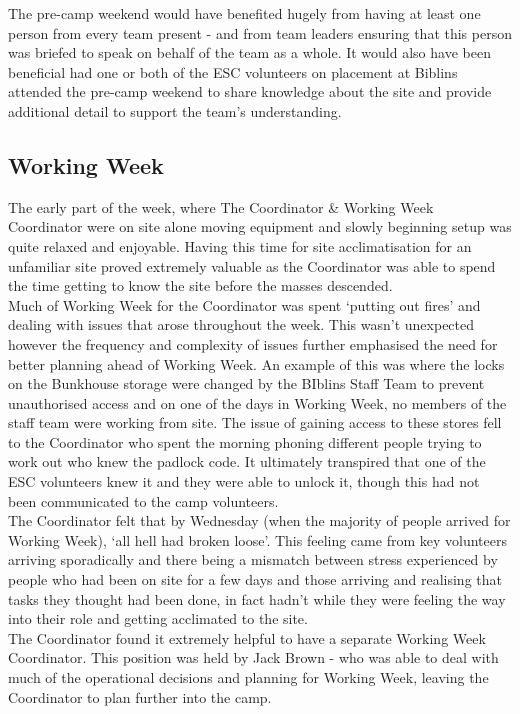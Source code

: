 The pre-camp weekend would have benefited hugely from having at least one person from every team present - and from team leaders ensuring that this person was briefed to speak on behalf of the team as a whole. It would also have been beneficial had one or both of the ESC volunteers on placement at Biblins attended the pre-camp weekend to share knowledge about the site and provide additional detail to support the team's understanding.

\subsection{Working Week}
The early part of the week, where The Coordinator \& Working Week Coordinator were on site alone moving equipment and slowly beginning setup was quite relaxed and enjoyable. Having this time for site acclimatisation for an unfamiliar site proved extremely valuable as the Coordinator was able to spend the time getting to know the site before the masses descended.\\

Much of Working Week for the Coordinator was spent `putting out fires' and dealing with issues that arose throughout the week. This wasn't unexpected however the frequency and complexity of issues further emphasised the need for better planning ahead of Working Week. An example of this was where the locks on the Bunkhouse storage were changed by the BIblins Staff Team to prevent unauthorised access and on one of the days in Working Week, no members of the staff team were working from site. The issue of gaining access to these stores fell to the Coordinator who spent the morning phoning different people trying to work out who knew the padlock code. It ultimately transpired that one of the ESC volunteers knew it and they were able to unlock it, though this had not been communicated to the camp volunteers.\\

The Coordinator felt that by Wednesday (when the majority of people arrived for Working Week), `all hell had broken loose'. This feeling came from key volunteers arriving sporadically and there being a mismatch between stress experienced by people who had been on site for a few days and those arriving and realising that tasks they thought had been done, in fact hadn't while they were feeling the way into their role and getting acclimated to the site.\\

The Coordinator found it extremely helpful to have a separate Working Week Coordinator. This position was held by Jack Brown - who was able to deal with much of the operational decisions and planning for Working Week, leaving the Coordinator to plan further into the camp. 


